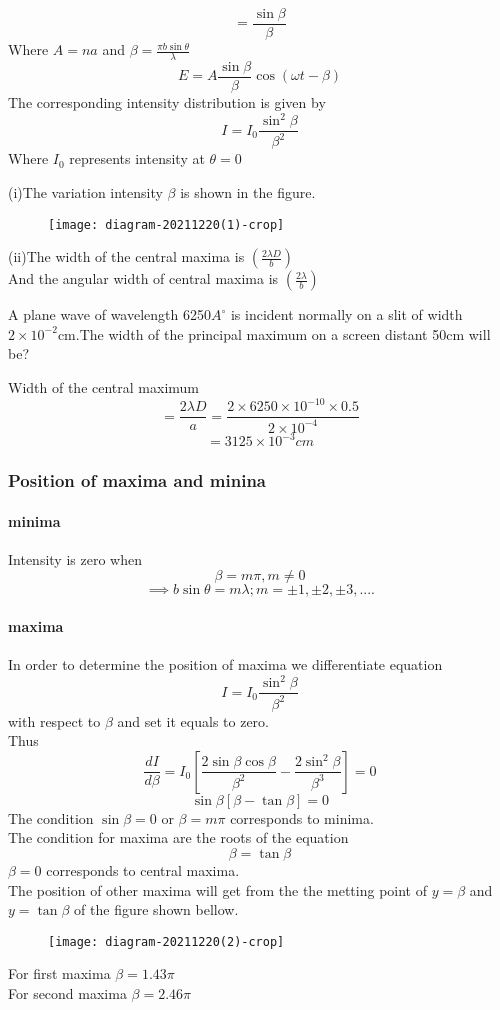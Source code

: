 $$=\frac{\sin \beta}{\beta}$$
Where $A=na$ and $\beta=\frac{\pi b \sin \theta}{\lambda}$
$$E=A\frac{ \sin \beta}{\beta} \cos(\omega t-\beta)$$
The corresponding intensity distribution is given by
$$I=I_0\frac{\sin^2\beta}{\beta^2}$$
Where $I_0$ represents intensity at $\theta=0$\\
\begin{note}
(i)The variation intensity $\beta$ is shown in the figure.
\begin{figure}[H]
	\centering
	\texttt{[image: diagram-20211220(1)-crop]}
	\caption{}
	\label{}
\end{figure}
(ii)The width of the central maxima is $\left( \frac{2\lambda D}{b}\right)$ \\
And the angular width of central maxima is $\left( \frac{2\lambda}{b}\right)$ 	
\end{note}
\begin{exercise}
	A plane wave of wavelength 6250$A^{\circ}$ is incident normally on a slit of width $2\times 10^{-2}$cm.The width of the principal maximum on a screen distant 50cm will be?
\end{exercise}
\begin{answer}
Width of the central maximum\\
$$=\frac{2\lambda D}{a}=\frac{2\times 6250 \times10^{-10}\times 0.5}{2\times 10^{-4}}$$
$$=3125\times 10^{-3}cm$$
\end{answer}
\subsubsection{Position of maxima and minina}
\paragraph{minima}
Intensity is zero when\\
$$\beta=m\pi,m\neq0$$
$$\implies b\sin \theta =m\lambda;m=\pm 1,\pm 2,\pm3,....$$
\paragraph{maxima} 
In order to determine the position of maxima we differentiate equation$$I=I_0\frac{\sin^2\beta}{\beta^2}$$ with respect to $\beta$ and set it equals to zero.\\Thus
$$\frac{dI}{d\beta}=I_0\left[ \frac{2\sin\beta \cos\beta}{\beta^2}-\frac{2\sin^2 \beta}{\beta^3}\right] =0$$
$$\sin\beta\left[ \beta-\tan \beta\right] =0$$
The condition $\sin \beta=0$ or $\beta=m\pi$ corresponds to minima.\\
The condition for maxima are the roots of the equation\\
$$\beta=\tan \beta$$
$\beta=0$ corresponds to central maxima.\\
The position of other maxima will get from the the metting point of $y=\beta$ and $y=\tan \beta$ of the figure shown bellow.
\begin{figure}[H]
	\centering
	\texttt{[image: diagram-20211220(2)-crop]}
	\caption{}
	\label{}
\end{figure}
For first maxima $\beta=1.43\pi$\\
For second maxima $\beta=2.46\pi$
